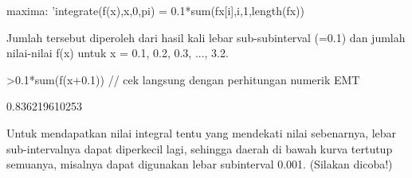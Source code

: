 \documentclass[a4paper,10pt]{article}
\begin{document}
\begin{eulernotebook}
\begin{eulercomment}
\begin{eulercomment}
\begin{eulercomment}
maxima: 'integrate(f(x),x,0,pi) = 0.1*sum(fx[i],i,1,length(fx))

Jumlah tersebut diperoleh dari hasil kali lebar sub-subinterval (=0.1)
dan jumlah nilai-nilai f(x) untuk x = 0.1, 0.2, 0.3, ..., 3.2.
\end{eulercomment}
\begin{eulerprompt}
>0.1*sum(f(x+0.1)) // cek langsung dengan perhitungan numerik EMT
\end{eulerprompt}
\begin{euleroutput}
  0.836219610253
\end{euleroutput}
\begin{eulercomment}
Untuk mendapatkan nilai integral tentu yang mendekati nilai sebenarnya, lebar
sub-intervalnya dapat diperkecil lagi, sehingga daerah di bawah kurva tertutup
semuanya, misalnya dapat digunakan lebar subinterval 0.001. (Silakan dicoba!)


\end{eulercomment}
\end{eulercomment}
\end{eulercomment}
\end{eulernotebook}
\end{document}
